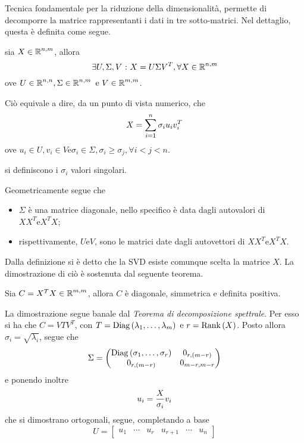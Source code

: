 \documentclass{subfiles}
\begin{document}
Tecnica fondamentale per la riduzione della dimensionalità, permette di decomporre la matrice rappresentanti i dati in tre sotto-matrici.
Nel dettaglio, questa è definita come segue.
\begin{Definition*}
    sia $X \in \operatorname{\mathbb{R}}^{n,m}$, allora
    $$
        \exists U, \Sigma, V \operatorname{\, : \,} X = U\Sigma V^{T}, \forall X \in \operatorname{\mathbb{R}}^{n, m}
    $$
    ove $U \in \Real^{n,n} , \Sigma \in \Real^{n,m} \text{e} V \in \Real^{m,m}$.
\end{Definition*}
Ciò equivale a dire, da un punto di vista numerico, che
$$
    X = \Sum{\sigma_{i}u_{i}v_{i}^{T}}{i = 1}[n]
$$
ove $u_{i} \in U, v_{i} \in V \text{e} \sigma_{i} \in \Sigma, \sigma_{i} \ge \sigma_{j}, \forall i < j < n$.\\
\begin{MarginNote}
    si definiscono i $\sigma_{i}$ valori singolari.
\end{MarginNote}
Geometricamente segue che
\begin{itemize}
    \item $\Sigma$ è una matrice diagonale, nello specifico è data dagli autovalori di $XX^{T} \text{e} X^{T}X$;
    \item rispettivamente, $U \text{e} V$, sono le matrici date dagli autovettori di $XX^{T} \text{e} X^{T}X$.
\end{itemize}

Dalla definizione si è detto che la SVD esiste comunque scelta la matrice $X$. La dimostrazione di ciò è sostenuta dal seguente teorema.
\begin{Theorem*}
    Sia $C = X^{T}X \in \operatorname{\mathbb{R}}^{m,m}$, allora $C$ è diagonale, simmetrica e definita positiva.
    \begin{Proof*}
        La dimostrazione segue banale dal \emph{Teorema di decomposizione spettrale}.
        Per esso si ha che $C = V T V^{T}$, con $T = \Diagonal{\List{\lambda}{1}{m}} \text{e} r = \RankOf{X}$.
        Posto allora $\sigma_{i} = \sqrt{\lambda_{i}}$, segue che
        $$\Sigma = \begin{pmatrix}
                \operatorname{Diag} \left({{\sigma}_{1}, \ldots, {\sigma}_{r}}\right) & 0_{r, (m - r)}   \\
                0_{r, (m - r)}                 & 0_{m - r, m - r} \\
            \end{pmatrix}$$
        e ponendo inoltre
        $$
            u_{i} = \Frac{X}{\sigma_{i}}v_{i}
        $$
        che si dimostrano ortogonali, segue, completando a base
        $$U = \begin{bmatrix}
                u_{1} & \cdots & u_{r} & u_{r + 1} & \cdots & u_{n}
            \end{bmatrix}$$
    \end{Proof*}
\end{Theorem*}
\end{document}
